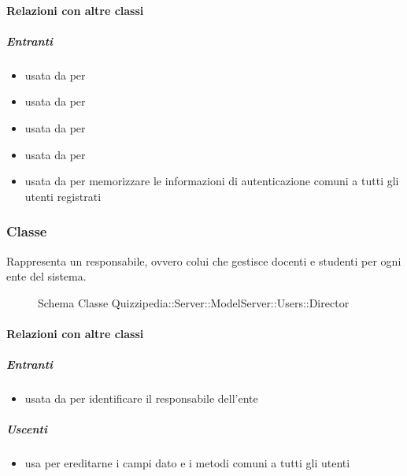 \paragraph{Relazioni con altre classi}
\subparagraph{Entranti}
\begin{itemize}
\item usata da  per 
\item usata da  per 
\item usata da  per 
\item usata da  per 
\item usata da  per memorizzare le informazioni di autenticazione comuni a tutti gli utenti registrati
\end{itemize}
\subsubsection{Classe }
Rappresenta un responsabile, ovvero colui che gestisce docenti e studenti per ogni ente del sistema.
\begin{figure}[H]
\centering
\noindent{}
\caption[Schema Classe Director]{Schema Classe Quizzipedia::Server::ModelServer::Users::Director}
\end{figure}
\paragraph{Relazioni con altre classi}
\subparagraph{Entranti}
\begin{itemize}
\item usata da  per identificare il responsabile dell'ente
\end{itemize}
\subparagraph{Uscenti}
\begin{itemize}
\item usa  per ereditarne i campi dato e i metodi comuni a tutti gli utenti
\end{itemize}
